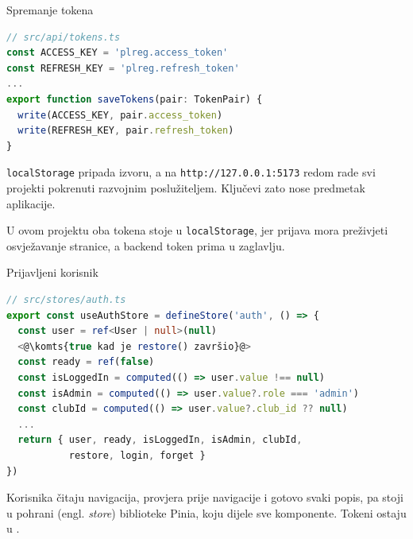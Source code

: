 \begin{frame}[fragile]{Spremanje tokena}
\begin{lstlisting}[language=typescript]
// src/api/tokens.ts
const ACCESS_KEY = 'plreg.access_token'
const REFRESH_KEY = 'plreg.refresh_token'
...
export function saveTokens(pair: TokenPair) {
  write(ACCESS_KEY, pair.access_token)
  write(REFRESH_KEY, pair.refresh_token)
}
\end{lstlisting}

\texttt{localStorage} pripada izvoru, a na \texttt{http://127.0.0.1:5173} redom rade svi projekti pokrenuti razvojnim poslužiteljem. Ključevi zato nose predmetak aplikacije.

\vspace{0.1em}
\begin{konvencija}
U ovom projektu oba tokena stoje u \texttt{localStorage}, jer prijava mora preživjeti osvježavanje stranice, a backend token prima u zaglavlju.
\end{konvencija}
\end{frame}

\begin{frame}[fragile]{Prijavljeni korisnik}
\begin{lstlisting}[language=typescript]
// src/stores/auth.ts
export const useAuthStore = defineStore('auth', () => {
  const user = ref<User | null>(null)
  <@\komts{true kad je restore() završio}@>
  const ready = ref(false)
  const isLoggedIn = computed(() => user.value !== null)
  const isAdmin = computed(() => user.value?.role === 'admin')
  const clubId = computed(() => user.value?.club_id ?? null)
  ...
  return { user, ready, isLoggedIn, isAdmin, clubId,
           restore, login, forget }
})
\end{lstlisting}

\vspace{0.3em}
Korisnika čitaju navigacija, provjera prije navigacije i gotovo svaki popis, pa stoji u pohrani (engl. \emph{store}) biblioteke Pinia, koju dijele sve komponente. Tokeni ostaju u .
\end{frame}

